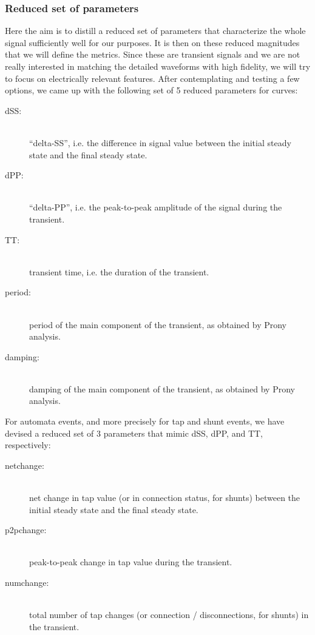\documentclass[conference]{IEEEtran}
\begin{document}
\subsubsection{Reduced set of parameters}
Here the aim is to distill a reduced set of parameters that
characterize the whole signal sufficiently well for our purposes. It
is then on these reduced magnitudes that we will define the metrics.
Since these are transient signals and we are not really interested in
matching the detailed waveforms with high fidelity, we will try to
focus on electrically relevant features.  After contemplating and
testing a few options, we came up with the following set of 5 reduced
parameters for curves:
\begin{description}
\item[dSS:] \hfill \\ ``delta-SS'', i.e. the difference in signal value between
  the initial steady state and the final steady state.
\item[dPP:] \hfill \\ ``delta-PP'', i.e. the peak-to-peak amplitude of the
  signal during the transient.
\item[TT:] \hfill \\ transient time, i.e. the duration of the transient.
\item[period:] \hfill \\ period of the main component of the transient, as
  obtained by Prony analysis.
\item[damping:] \hfill \\ damping of the main component of the transient, as
  obtained by Prony analysis.
\end{description}

For automata events, and more precisely for tap and shunt events, we have
devised a reduced set of 3 parameters that mimic dSS, dPP, and TT, respectively:
\begin{description}
\item[netchange:] \hfill \\ net change in tap value (or in connection status,
  for shunts) between the initial steady state and the final steady state.
\item[p2pchange:] \hfill \\ peak-to-peak change in tap value during the
  transient.
\item[numchange:] \hfill \\ total number of tap changes (or connection /
  disconnections, for shunts) in the transient.
\end{description}
\end{document}
